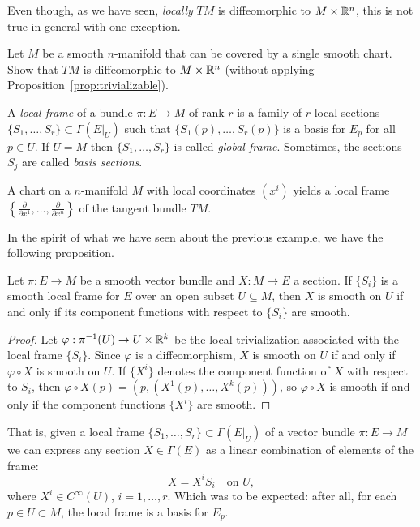 Even though, as we have seen, \emph{locally} $TM$ is diffeomorphic to $M\times\mathbb{R}^n$, this is not true in general with one exception.
\begin{exercise}\label{ex:trivializable}
  Let $M$ be a smooth $n$-manifold that can be covered by a single smooth chart.
  Show that $TM$ is diffeomorphic to $M\times\mathbb{R}^n$ (without applying Proposition~\ref{prop:trivializable}).
\end{exercise}

\begin{definition}
  A \emph{local frame} of a bundle $\pi:E\to M$ of rank $r$ is a family of $r$ local sections $\{S_1, \ldots, S_r\}\subset\Gamma(E|_U)$ such that $\{S_1(p), \ldots, S_r(p)\}$ is a basis for $E_p$ for all $p\in U$.
  If $U=M$ then $\{S_1, \ldots, S_r\}$ is called \emph{global frame}.
  Sometimes, the sections $S_j$ are called \emph{basis sections}.
\end{definition}

\begin{example}
  A chart on a $n$-manifold $M$ with local coordinates $(x^i)$ yields a local frame $\left\{\frac{\partial}{\partial x^1}, \ldots, \frac{\partial}{\partial x^n}\right\}$ of the tangent bundle $TM$.
\end{example}

In the spirit of what we have seen about the previous example, we have the following proposition.

\begin{proposition}
  Let $\pi:E \to M$ be a smooth vector bundle and $X:M\to E$ a section.
  If $\{S_i\}$ is a smooth local frame for $E$ over an open subset $U\subseteq M$, then $X$ is smooth on $U$ if and only if its component functions with respect to $\{S_i\}$ are smooth.
\end{proposition}
\begin{proof}
  Let $\varphi:\pi^{-1}(U) \to U\times\mathbb{R}^k$ be the local trivialization associated with the local frame $\{S_i\}$.
  Since $\varphi$ is a diffeomorphism, $X$ is smooth on $U$ if and only if $\varphi\circ X$ is smooth on $U$.
  If $\{X^i\}$ denotes the component function of $X$ with respect to $S_i$, then $\varphi\circ X (p) = (p, (X^1(p), \ldots, X^k(p)))$, so $\varphi\circ X$ is smooth if and only if the component functions $\{X^i\}$ are smooth.
\end{proof}

That is, given a local frame $\{S_1, \ldots, S_r\}\subset\Gamma(E|_U)$ of a vector bundle $\pi: E \to M$ we can express any section $X\in\Gamma(E)$ as a linear combination of elements of the frame:
\begin{equation}
  X = X^i S_i \quad\mbox{on }U,
\end{equation}
where $X^i\in C^\infty(U)$, $i=1,\ldots,r$.
Which was to be expected: after all, for each $p\in U\subset M$, the local frame is a basis for $E_p$.


